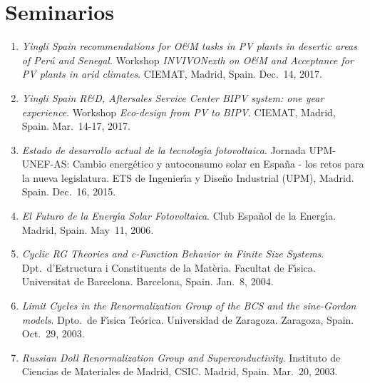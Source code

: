 \documentclass{article}
\begin{document}

\newpage


\section*{Seminarios}

\begin{enumerate}
\item
{\it Yingli Spain recommendations for O\&M tasks in PV plants in desertic areas of Per\'u and Senegal}. 
Workshop {\it INVIVONexth on O\&M and Acceptance for PV plants in arid climates}.
CIEMAT, Madrid, Spain.
Dec.~14, 2017.

\item
{\it Yingli Spain R\&D, Aftersales Service Center BIPV system: one year experience}. 
Workshop {\it Eco-design from PV to BIPV}.
CIEMAT, Madrid, Spain.
Mar.~14-17, 2017.

\item
{\it Estado de desarrollo actual de la tecnolog{\'\i}a fotovoltaica}. 
Jornada UPM-UNEF-AS: Cambio energ\'etico y autoconsumo solar en Espa\~na - los retos para la nueva legislatura.
ETS de Ingenier{\'\i}a y Dise\~no Industrial (UPM), Madrid. Spain.
Dec.~16, 2015.

\item
{\it El Futuro de la Energ\'{\i}a Solar Fotovoltaica}.
Club Espa\~nol de la Energ\'{\i}a.
Madrid, Spain.
May~11, 2006. 

\item
{\it Cyclic RG Theories and c-Function Behavior in Finite Size Systems}.
Dpt.~d'Estruc\-tura i Constituents de la Mat\`eria.
Facultat de F\'{\i}sica. Universitat de Barcelona.
Barcelona, Spain.
Jan.~8, 2004.

\item
{\it Limit Cycles in the Renormalization Group of the BCS and the sine-Gordon models}. 
Dpto.\ de F\'{\i}sica Te\'orica. Universidad de Zaragoza.
Zaragoza, Spain.
Oct.~29, 2003.

\item
{\it Russian Doll Renormalization Group and Superconductivity}. 
Instituto de Ciencias de Materiales de Madrid, CSIC. 
Madrid, Spain.
Mar.~20, 2003.


\end{enumerate}
\end{document}

